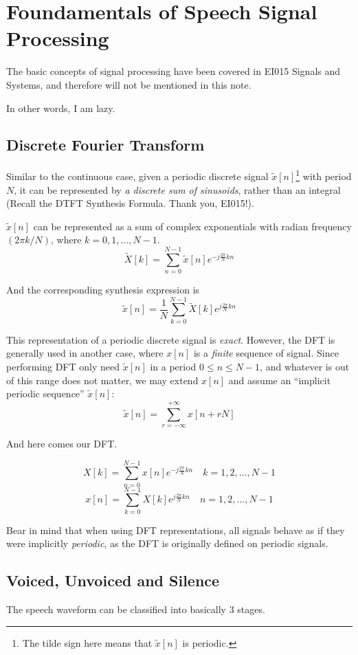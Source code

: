 \chapter{Foundamentals of Speech Signal Processing}
The basic concepts of signal processing have been covered in EI015 Signals and Systems,  and therefore will not be mentioned in this note.

In other words, I am lazy.
\newpage
\section{Discrete Fourier Transform}
Similar to the continuous case, given a periodic discrete signal $\tilde{x}[n]$\footnote{The tilde sign here means that $\tilde{x}[n]$ is periodic.} with period $N$, it can be represented by \emph{a discrete sum of sinusoids}, rather than an integral (Recall the DTFT Synthesis Formula. Thank you, EI015!).

$\tilde{x}[n]$ can be represented as a sum of complex exponentials with radian frequency $(2\pi k / N)$, where $k=0,1,\dots,N-1$.
\[ \tilde{X}[k] = \sum_{n=0}^{N-1}\tilde{x}[n]e^{-j\frac{2\pi}{N}kn} \]

And the corresponding synthesis expression is
\[ \tilde{x}[n] = \frac{1}{N}\sum_{k=0}^{N-1}\tilde{X}[k]e^{j\frac{2\pi}{N}kn} \]

This representation of a periodic discrete signal is \emph{exact}. However, the DFT is generally used in another case, where $x[n]$ is a \emph{finite} sequence of signal. Since performing DFT only need $\tilde{x}[n]$ in a period $0 \le n \le N-1$, and whatever is out of this range does not matter, we may extend $x[n]$ and assume an ``implicit periodic sequence'' $\tilde{x}[n]$:
\[ \tilde{x}[n] = \sum_{r = -\infty}^{+\infty} x[n + rN] \]

And here comes our DFT.
\begin{definition}
    \[ X[k] = \sum_{n=0}^{N-1} x[n]e^{-j\frac{2\pi}{N}kn} \quad k = 1,2,\dots,N-1 \]
    \[ x[n] = \sum_{k=0}^{N-1} X[k]e^{j\frac{2\pi}{N}kn} \quad n = 1,2,\dots,N-1 \]
\end{definition}
\begin{remark}
    Bear in mind that when using DFT representations, all signals behave as if they were implicitly \emph{periodic}, as the DFT is originally defined on periodic signals.
\end{remark}

\section{Voiced, Unvoiced and Silence}
The speech waveform can be classified into basically 3 stages.
